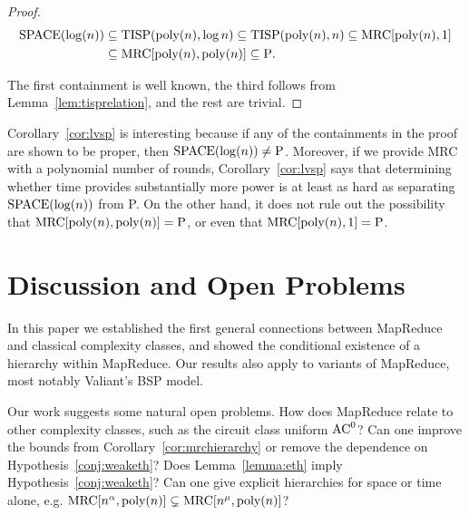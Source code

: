 \documentclass{llncs}
\newcommand{\mrc}{\textup{MRC}}
\newcommand{\TISP}{\textup{TISP}}
\renewcommand{\P}{\textup{P}}
\renewcommand{\L}{\textup{SPACE}(\log(n))}
\begin{document}
\begin{proof}
\begin{align*}	\L &\subseteq \TISP(\textup{poly}(n), \log n) \subseteq
\TISP(\textup{poly}(n), n) \subseteq \mrc[\textup{poly}(n), 1] \\ &\subseteq
\mrc[\textup{poly}(n), \textup{poly}(n)] \subseteq \P.\end{align*}

The first containment is well known, the third follows from 
Lemma~\ref{lem:tisprelation}, and the rest are trivial.
\end{proof}

Corollary~\ref{cor:lvsp} is interesting because if any of the containments in
the proof are shown to be proper, then $\L \neq \P$. Moreover, if we provide
MRC with a polynomial number of rounds, Corollary~\ref{cor:lvsp} says that
determining whether time provides substantially more power is at least as hard
as separating $\L$ from P. On the other hand, it does not rule out the possibility
that $\mrc[\textup{poly}(n), \textup{poly}(n)] = \P$, or even that
$\mrc[\textup{poly}(n), 1] = \P$.

\section{Discussion and Open Problems}\label{sec:openproblems}

In this paper we established the first general connections between MapReduce
and classical complexity classes, and showed the conditional existence of a
hierarchy within MapReduce. Our results also apply to variants of MapReduce,
most notably Valiant's BSP model.  


Our work suggests some natural open problems. How does MapReduce relate to
other complexity classes, such as the circuit class uniform $\textup{AC}^0$?
Can one improve the bounds from Corollary~\ref{cor:mrchierarchy} or remove the
dependence on Hypothesis~\ref{conj:weaketh}? Does Lemma~\ref{lemma:eth} imply
Hypothesis~\ref{conj:weaketh}? Can one give explicit hierarchies for space or
time alone, e.g. $\mrc[n^\alpha, \text{poly}(n)] \subsetneq \mrc[n^\mu,
\text{poly}(n)]$?
\end{document}
